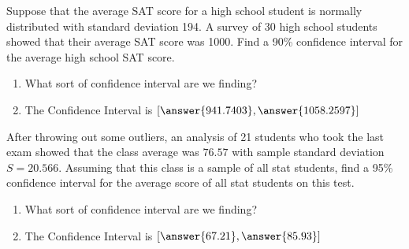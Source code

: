 \documentclass{ximera}
\begin{document}
\begin{problem}
Suppose that the average SAT score for a high school student is normally distributed  with standard deviation 194.  A survey of 30 high school students showed that their average SAT score was 1000.  Find a 90\% confidence interval for the average high school SAT score.

\begin{enumerate}
\item What sort of confidence interval are we finding?

\begin{multipleChoice}
\end{multipleChoice}

\item The Confidence Interval is $[\answer{941.7403}, \answer{1058.2597}]$

\end{enumerate}


\end{problem}


\begin{problem}
After throwing out some outliers, an analysis of 21 students who took the last exam showed that the class average was $76.57$ with sample standard deviation $S=20.566$.  Assuming that this class is a sample of all stat students, find a 95\% confidence interval for the average score of all stat students on this test.

\begin{enumerate}
\item What sort of confidence interval are we finding?

\begin{multipleChoice}
\end{multipleChoice}

\item The Confidence Interval is $[\answer{67.21}, \answer{85.93}]$

\end{enumerate}



\end{problem}
\end{document}
